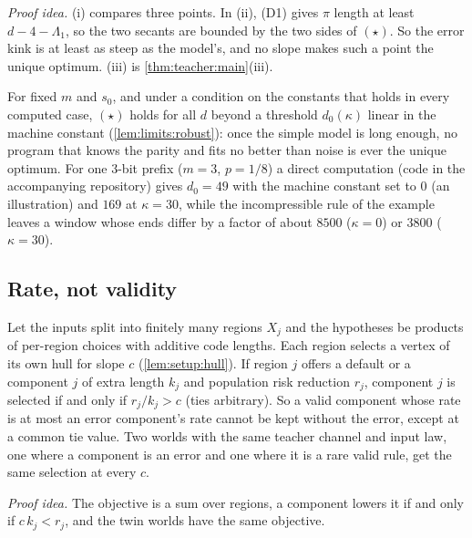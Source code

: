 \emph{Proof idea.} (i) compares three points. In (ii), (D1) gives $\pi$ length at least $d-4-\Lambda_1$, so the two secants are bounded by the two sides of $(\star)$. So the error kink is at least as steep as the model's, and no slope makes such a point the unique optimum. (iii) is \cref{thm:teacher:main}(iii).

For fixed $m$ and $s_0$, and under a condition on the constants that holds in every computed case, $(\star)$ holds for all $d$ beyond a threshold $d_0(\kappa)$ linear in the machine constant (\cref{lem:limits:robust}): once the simple model is long enough, no program that knows the parity and fits no better than noise is ever the unique optimum. For one $3$-bit prefix ($m=3$, $p=1/8$) a direct computation (code in the accompanying repository) gives $d_0=49$ with the machine constant set to $0$ (an illustration) and $169$ at $\kappa=30$, while the incompressible rule of the example leaves a window whose ends differ by a factor of about $8500$ ($\kappa=0$) or $3800$ ($\kappa=30$).

\subsection{Rate, not validity}\label{sec:limits:other}

\begin{proposition}\label{prop:limits:separable}
Let the inputs split into finitely many regions $X_j$ and the hypotheses be products of per-region choices with additive code lengths. Each region selects a vertex of its own hull for slope $c$ (\cref{lem:setup:hull}). If region $j$ offers a default or a component $j$ of extra length $k_j$ and population risk reduction $r_j$, component $j$ is selected if and only if $r_j/k_j>c$ (ties arbitrary). So a valid component whose rate is at most an error component's rate cannot be kept without the error, except at a common tie value. Two worlds with the same teacher channel and input law, one where a component is an error and one where it is a rare valid rule, get the same selection at every $c$.
\end{proposition}

\emph{Proof idea.} The objective is a sum over regions, a component lowers it if and only if $c\,k_j<r_j$, and the twin worlds have the same objective.

